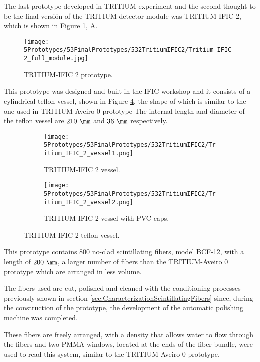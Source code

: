 The last prototype developed in TRITIUM experiment and the second thought to be the final versión of the TRITIUM detector module was TRITIUM-IFIC 2, which is shown in Figure \ref{fig:TritiumIFIC2}, A.

\begin{figure}[h]
\centering
\texttt{[image: 5Prototypes/53FinalPrototypes/532TritiumIFIC2/Tritium\_IFIC\_2\_full\_module.jpg]}
\caption{TRITIUM-IFIC 2 prototype.\label{fig:TritiumIFIC2}}
\end{figure}

This prototype was designed and built in the IFIC workshop and it consists of a cylindrical teflon vessel, shown in Figure \ref{fig:Tritium-IFIC2_vessels}, the shape of which is similar to the one used in TRITIUM-Aveiro 0 prototype The internal length and diameter of the teflon vessel are $210~\mm$ and $36~\mm$ respectively.

\begin{figure}
\centering
    \begin{subfigure}[b]{0.35\textwidth}
    \centering
    \texttt{[image: 5Prototypes/53FinalPrototypes/532TritiumIFIC2/Tritium\_IFIC\_2\_vessel1.png]}  
    \caption{TRITIUM-IFIC 2 vessel.\label{subfig:Tritium_IFIC_2_vessel}}
    \end{subfigure}
    \hfill
    \begin{subfigure}[b]{0.3\textwidth}
    \centering
    \texttt{[image: 5Prototypes/53FinalPrototypes/532TritiumIFIC2/Tritium\_IFIC\_2\_vessel2.png]}  
    \caption{TRITIUM-IFIC 2 vessel with PVC caps.\label{subfig:TritiumIFIC2_vessel_with_PVC_caps}}
    \end{subfigure}
 \caption{TRITIUM-IFIC 2 teflon vessel.}
 \label{fig:Tritium-IFIC2_vessels}
\end{figure}

This prototype contains $800$ no-clad scintillating fibers, model BCF-12, with a length of $200~\mm$, a larger number of fibers than the TRITIUM-Aveiro 0 prototype which are arranged in less volume.

The fibers used are cut, polished and cleaned with the conditioning processes previously shown in section \ref{sec:CharacterizationScintillatingFibers} since, during the construction of the prototype, the development of the automatic polishing machine was completed.

These fibers are freely arranged, with a density that allows water to flow through the fibers and two PMMA windows, located at the ends of the fiber bundle, were used to read this system, similar to the TRITIUM-Aveiro 0 prototype. 

